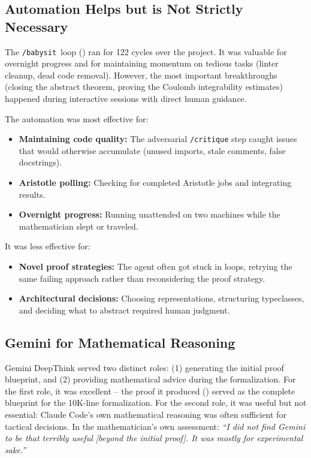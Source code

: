 \documentclass[11pt]{article}
\newcommand{\babysit}{\texttt{/babysit}}
\begin{document}
\subsection{Automation Helps but is Not Strictly Necessary}

The \babysit\ loop () ran for 122 cycles over the project. It was valuable for overnight progress and for maintaining momentum on tedious tasks (linter cleanup, dead code removal). However, the most important breakthroughs (closing the abstract theorem, proving the Coulomb integrability estimates) happened during interactive sessions with direct human guidance.

The automation was most effective for:
\begin{itemize}[leftmargin=2em]
  \item \textbf{Maintaining code quality:} The adversarial \texttt{/critique} step caught issues that would otherwise accumulate (unused imports, stale comments, false docstrings).
  \item \textbf{Aristotle polling:} Checking for completed Aristotle jobs and integrating results.
  \item \textbf{Overnight progress:} Running unattended on two machines while the mathematician slept or traveled.
\end{itemize}

It was less effective for:
\begin{itemize}[leftmargin=2em]
  \item \textbf{Novel proof strategies:} The agent often got stuck in loops, retrying the same failing approach rather than reconsidering the proof strategy.
  \item \textbf{Architectural decisions:} Choosing representations, structuring typeclasses, and deciding what to abstract required human judgment.
\end{itemize}

\subsection{Gemini for Mathematical Reasoning}

Gemini DeepThink served two distinct roles: (1) generating the initial proof blueprint, and (2) providing mathematical advice during the formalization. For the first role, it was excellent -- the proof it produced () served as the complete blueprint for the 10K-line formalization. For the second role, it was useful but not essential: Claude Code's own mathematical reasoning was often sufficient for tactical decisions. In the mathematician's own assessment: \emph{``I did not find Gemini to be that terribly useful [beyond the initial proof]. It was mostly for experimental sake.''}
\end{document}
